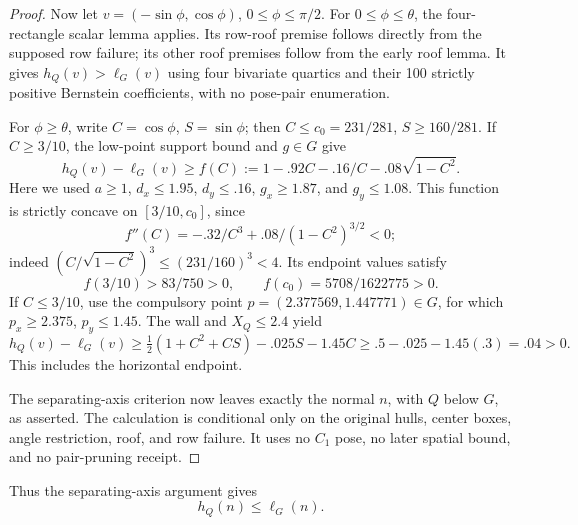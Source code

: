\documentclass[11pt]{article}
\begin{document}
\begin{proof}
Now let $v=(-\sin\phi,\cos\phi)$, $0\le\phi\le\pi/2$.
For $0\le\phi\le\theta$, the four-rectangle scalar lemma applies.
Its row-roof premise follows directly from the supposed row failure;
its other roof premises follow from the early roof lemma. It gives
$h_Q(v)>\ell_G(v)$ using four bivariate quartics and their 100
strictly positive Bernstein coefficients, with no pose-pair enumeration.

For $\phi\ge\theta$, write $C=\cos\phi$, $S=\sin\phi$;
then $C\le c_0=231/281$, $S\ge160/281$.
If $C\ge3/10$, the low-point support bound and $g\in G$ give
\[
 h_Q(v)-\ell_G(v)
 \ge f(C):=1-.92C-.16/C-.08\sqrt{1-C^2}.
\]
Here we used $a\ge1$, $d_x\le1.95$, $d_y\le.16$,
$g_x\ge1.87$, and $g_y\le1.08$.
This function is strictly concave on $[3/10,c_0]$, since
\[
 f''(C)=-.32/C^3+.08/(1-C^2)^{3/2}<0;
\]
indeed $(C/\sqrt{1-C^2})^3\le(231/160)^3<4$.
Its endpoint values satisfy
\[
 f(3/10)>83/750>0,\qquad f(c_0)=5708/1622775>0.
\]
If $C\le3/10$, use the compulsory point
$p=(2.377569,1.447771)\in G$, for which $p_x\ge2.375$,
$p_y\le1.45$. The wall and $X_Q\le2.4$ yield
\[
 h_Q(v)-\ell_G(v)
 \ge\tfrac12(1+C^2+CS)-.025S-1.45C
 \ge .5-.025-1.45(.3)=.04>0.
\]
This includes the horizontal endpoint.

The separating-axis criterion now leaves exactly the normal $n$,
with $Q$ below $G$, as asserted. The calculation is conditional only on
the original hulls, center boxes, angle restriction, roof, and row failure.
It uses no $C_1$ pose, no later spatial bound, and no pair-pruning receipt.
\end{proof}

Thus the separating-axis argument gives
\begin{equation}\label{eq:scalar-early-row-Q-below}
 h_Q(n)\le\ell_G(n).
\end{equation}
\end{document}
